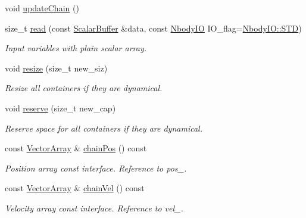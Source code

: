 \begin{DoxyCompactItemize}
void \mbox{\hyperlink{class_space_h_1_1_vel_indep_chain_particles_a06d1ed1c4eaef6229aabf5ad3f2de45d}{update\+Chain}} ()
\item 
size\+\_\+t \mbox{\hyperlink{class_space_h_1_1_vel_indep_chain_particles_a60778581313c992696314625eb2b30cf}{read}} (const \mbox{\hyperlink{class_space_h_1_1_vel_indep_particles_abca40159a816385790d5a6fd19c1dc6d}{Scalar\+Buffer}} \&data, const \mbox{\hyperlink{namespace_space_h_a296a8bae763a754564bfdce216e31b59}{Nbody\+IO}} I\+O\+\_\+flag=\mbox{\hyperlink{namespace_space_h_a296a8bae763a754564bfdce216e31b59ac6ce23be5d350ce18a665427d2d950f7}{Nbody\+I\+O\+::\+S\+TD}})
\begin{DoxyCompactList}\small\item\em Input variables with plain scalar array. \end{DoxyCompactList}\item 
void \mbox{\hyperlink{class_space_h_1_1_vel_indep_chain_particles_afdf6136619e4be707bed1e9859bc7171}{resize}} (size\+\_\+t new\+\_\+siz)
\begin{DoxyCompactList}\small\item\em Resize all containers if they are dynamical. \end{DoxyCompactList}\item 
void \mbox{\hyperlink{class_space_h_1_1_vel_indep_chain_particles_a9a6b23671b53391cded80cde58b18608}{reserve}} (size\+\_\+t new\+\_\+cap)
\begin{DoxyCompactList}\small\item\em Reserve space for all containers if they are dynamical. \end{DoxyCompactList}\item 
const \mbox{\hyperlink{class_space_h_1_1_vel_indep_particles_aa9983058940249df8b00fa800e8cbad2}{Vector\+Array}} \& \mbox{\hyperlink{class_space_h_1_1_vel_indep_chain_particles_a2dd7d2f703141d0ef3d8728b2a57cb83}{chain\+Pos}} () const
\begin{DoxyCompactList}\small\item\em Position array const interface. Reference to pos\+\_\+. \end{DoxyCompactList}\item 
const \mbox{\hyperlink{class_space_h_1_1_vel_indep_particles_aa9983058940249df8b00fa800e8cbad2}{Vector\+Array}} \& \mbox{\hyperlink{class_space_h_1_1_vel_indep_chain_particles_a741064afd96c861eac50e8de239eedaa}{chain\+Vel}} () const
\begin{DoxyCompactList}\small\item\em Velocity array const interface. Reference to vel\+\_\+. \end{DoxyCompactList}\item 

\end{DoxyCompactItemize}
